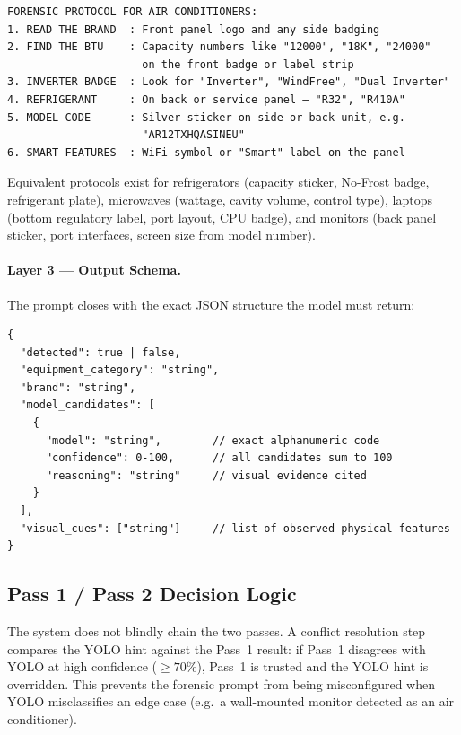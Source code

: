 \begin{lstlisting}[language={}, caption={Pass 2 category protocol — air conditioner (frame\_detector.py)}, label={lst:pass2-ac}]
FORENSIC PROTOCOL FOR AIR CONDITIONERS:
1. READ THE BRAND  : Front panel logo and any side badging
2. FIND THE BTU    : Capacity numbers like "12000", "18K", "24000"
                     on the front badge or label strip
3. INVERTER BADGE  : Look for "Inverter", "WindFree", "Dual Inverter"
4. REFRIGERANT     : On back or service panel — "R32", "R410A"
5. MODEL CODE      : Silver sticker on side or back unit, e.g.
                     "AR12TXHQASINEU"
6. SMART FEATURES  : WiFi symbol or "Smart" label on the panel
\end{lstlisting}

Equivalent protocols exist for refrigerators (capacity sticker, No-Frost badge, refrigerant plate), microwaves (wattage, cavity volume, control type), laptops (bottom regulatory label, port layout, CPU badge), and monitors (back panel sticker, port interfaces, screen size from model number).

\paragraph{Layer 3 — Output Schema.} The prompt closes with the exact JSON structure the model must return:

\begin{lstlisting}[language={}, caption={Pass 2 required JSON output structure}, label={lst:pass2-output}]
{
  "detected": true | false,
  "equipment_category": "string",
  "brand": "string",
  "model_candidates": [
    {
      "model": "string",        // exact alphanumeric code
      "confidence": 0-100,      // all candidates sum to 100
      "reasoning": "string"     // visual evidence cited
    }
  ],
  "visual_cues": ["string"]     // list of observed physical features
}
\end{lstlisting}

\subsection{Pass 1 / Pass 2 Decision Logic}

The system does not blindly chain the two passes. A conflict resolution step compares the YOLO hint against the Pass~1 result: if Pass~1 disagrees with YOLO at high confidence ($\geq 70\%$), Pass~1 is trusted and the YOLO hint is overridden. This prevents the forensic prompt from being misconfigured when YOLO misclassifies an edge case (e.g.\ a wall-mounted monitor detected as an air conditioner).

